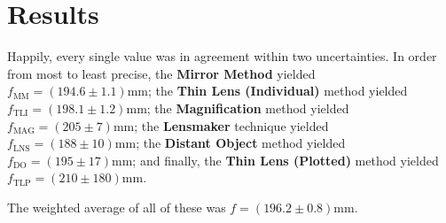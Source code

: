 \chapter{Results}


Happily, every single value was in agreement within two uncertainties. In order from most to least precise, the \textbf{Mirror Method} yielded $f_\text{MM} = (194.6 \pm 1.1) \unit{\milli\metre}$; the \textbf{Thin Lens (Individual)} method yielded $f_\text{TLI} = (198.1 \pm 1.2) \unit{\milli\metre}$; the \textbf{Magnification} method yielded $f_\text{MAG} = (205 \pm 7) \unit{\milli\metre}$; the \textbf{Lensmaker} technique yielded $f_\text{LNS} = (188 \pm 10) \unit{\milli\metre}$; the \textbf{Distant Object} method yielded $f_\text{DO} = (195 \pm 17) \unit{\milli\metre}$; and finally, the \textbf{Thin Lens (Plotted)} method yielded $f_\text{TLP} = (210 \pm 180) \unit{\milli\metre}$.

The weighted average of all of these was $f = (196.2 \pm 0.8) \unit{\milli\metre}$. 